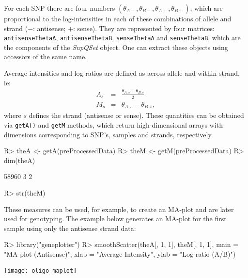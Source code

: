 \documentclass{article}
\newcommand{\Rmethod}[1]{{\texttt{#1}}}
\newcommand{\Robject}[1]{{\texttt{#1}}}
\newcommand{\Rclass}[1]{{\textit{#1}}}
\begin{document}
For each SNP there are four numbers $(\theta_{A-}, \theta_{B-},
\theta_{A+}, \theta_{B+})$, which are proportional to the
log-intensities in each of these combinations of allele and strand
($-$: antisense; $+$: sense). They are represented by four matrices:
\Robject{antisenseThetaA}, \Robject{antisenseThetaB},
\Robject{senseThetaA} and \Robject{senseThetaB}, which are the
components of the \Rclass{SnpQSet} object. One can extract these
objects using accessors of the same name.

Average intensities and log-ratios are defined as across allele and
within strand, ie:
\begin{eqnarray}
  A_{s} & = & \frac{\theta_{A, s}+\theta_{B, s}}{2} \\
  M_{s} & = & \theta_{A, s} - \theta_{B, s},
\end{eqnarray}
where $s$ defines the strand (antisense or sense). These quantities
can be obtained via \Rmethod{getA()} and \Rmethod{getM} methods, which
return high-dimensional arrays with dimensions corresponding to SNP's,
samples and strands, respectively.
\begin{Schunk}
\begin{Sinput}
R> theA <- getA(preProcessedData)
R> theM <- getM(preProcessedData)
R> dim(theA)
\end{Sinput}
\begin{Soutput}
[1] 58960     3     2
\end{Soutput}
\begin{Sinput}
R> str(theM)
\end{Sinput}
\end{Schunk}

These measures can be used, for example, to create an MA-plot and are
later used for genotyping. The example below generates an MA-plot for
the first sample using only the antisense strand data:
\begin{Schunk}
\begin{Sinput}
R> library("geneplotter")
R> smoothScatter(theA[, 1, 1], theM[, 1, 1], main = "MA-plot (Antisense)", 
     xlab = "Average Intensity", ylab = "Log-ratio (A/B)")
\end{Sinput}
\end{Schunk}
\texttt{[image: oligo-maplot]}
\end{document}
